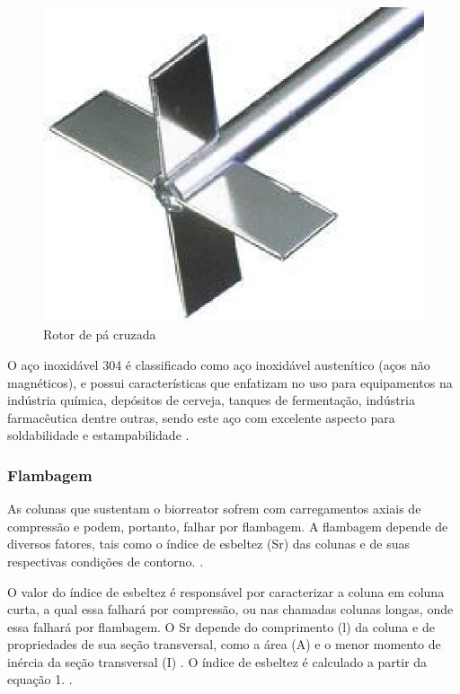 \begin{figure}[h]
	\centering
	\includegraphics[keepaspectratio=true,scale=0.6]{figuras/pa.eps}
	\caption{Rotor de pá cruzada}
	\label{pa}
\end{figure}

O aço inoxidável 304 é classificado como aço inoxidável austenítico (aços não magnéticos), e possui características que enfatizam no uso para equipamentos na indústria química, depósitos de cerveja, tanques de fermentação, indústria farmacêutica dentre outras, sendo este aço com excelente aspecto para soldabilidade e estampabilidade \cite{kloeckner}.

\subsubsection{Flambagem}

As colunas que sustentam o biorreator sofrem com carregamentos axiais de compressão e podem, portanto, falhar por flambagem. A flambagem depende de diversos fatores, tais como o índice de esbeltez (Sr) das colunas e de suas respectivas condições de contorno. \cite{norton2013projeto}.

O valor do índice de esbeltez é responsável por caracterizar a coluna em coluna curta, a qual essa falhará por compressão, ou nas chamadas colunas longas, onde essa falhará por flambagem. O Sr depende do comprimento (l) da coluna e de propriedades de sua seção transversal, como a área (A) e o menor momento de inércia da seção transversal (I) . O índice de esbeltez é calculado a partir da equação 1. \cite{norton2013projeto}.

